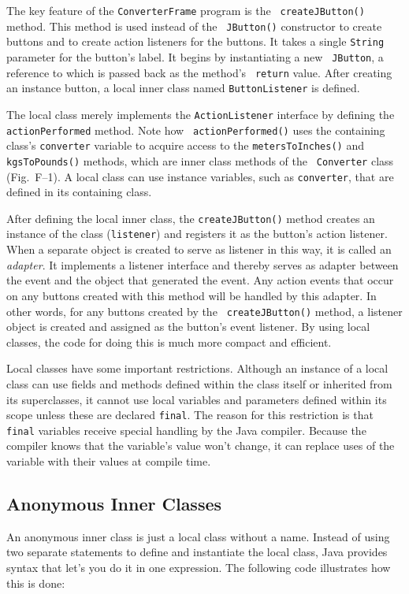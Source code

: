 The key feature of the {\tt ConverterFrame} program is the {\tt
createJButton()} method.  This method is used instead of the {\tt
JButton()} constructor to create buttons and to create action
listeners for the buttons. It takes a single {\tt String} parameter
for the button's label.  It begins by instantiating a new {\tt
JButton}, a reference to which is passed back as the method's {\tt
return} value.  After creating an instance button, a local inner class
named {\tt ButtonListener} is defined.

The local class merely implements the {\tt ActionListener} interface
by defining the {\tt actionPerformed} method.  Note how {\tt
actionPerformed()} uses the containing class's {\tt converter}
variable to acquire access to the {\tt meters\-ToInches()} and {\tt
kgsToPounds()} methods, which are inner class methods of the {\tt
Converter} class (Fig.~F--1). A local class can use
instance variables, such as {\tt converter}, that are defined in its
containing class.

After defining the local inner class, the {\tt createJButton()} method
creates an instance of the class ({\tt listener}) and registers it as
the button's action listener.  When a separate object is created to
serve as listener in this way, it is called an {\it adapter}. It
implements a listener interface and thereby serves as adapter between
the event and the object that generated the event.  Any action events
that occur on any buttons created with this method will be handled by
this adapter.   In other words, for any buttons created by the {\tt
createJButton()} method, a listener object is created and assigned as
the button's event listener.   By using local classes, the code for
doing this is much more compact and efficient.

Local classes have some important restrictions.  Although an instance
of a local class can use fields and methods defined within the class
itself or inherited from its superclasses, it cannot use local
variables and parameters defined within its scope unless these are
declared {\tt final}. The reason for this restriction is that {\tt
final} variables receive special handling by the Java
compiler.  Because the compiler knows that the variable's value won't
change, it can replace uses of the variable with their values at
compile time.


\pagebreak
\subsection*{Anonymous Inner Classes}
\noindent An anonymous inner class is just a local class without a name.  Instead
of using two separate statements to define and instantiate the local
class, Java provides syntax that let's you do it in one expression.
The following code illustrates how this is done:

